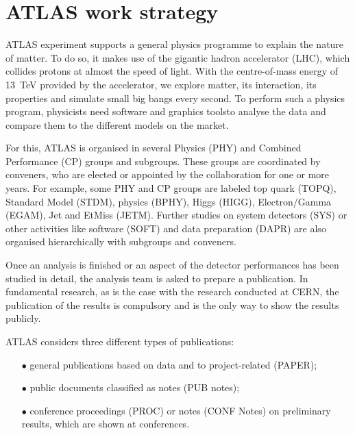 
\section{ATLAS work strategy}%
\label{sec:ATLAS_work_strategy}


ATLAS experiment supports a  general physics programme to explain the nature of matter. To do so,  it makes use of the gigantic hadron accelerator (LHC), which collides protons at almost the speed of light. With the centre-of-mass energy of \SI{13}{\TeV} provided by the accelerator, we explore matter, its interaction, its properties and simulate small big bangs every second. To perform such a physics program, physicists need software and graphics toolsto analyse the data and compare them to the different models on the market.

For this, ATLAS is organised in several Physics (PHY) and  Combined Performance (CP) groups and subgroups. These groups are coordinated by conveners, who are elected or appointed by the collaboration for one or more years.
For example, some  PHY and CP groups are labeled top quark (TOPQ), Standard Model (STDM), \PB physics (BPHY), Higgs (HIGG), Electron/Gamma (EGAM), Jet and EtMiss (JETM).
Further studies on system detectors (SYS) or other activities like software (SOFT) and data preparation (DAPR) are also organised hierarchically with subgroups and conveners.

Once an analysis is finished or an aspect of the detector performances has been studied in detail,
the analysis team is asked to prepare a publication.
In fundamental research, as is the case with the research conducted at CERN, the publication of the results is  compulsory and is the only way to show the results publicly.

ATLAS considers three different types of publications:
\begin{itemize}
    \item[\tiny$\bullet$] general publications based on data and to project-related  (PAPER);
    \item[\tiny$\bullet$] public documents classified as notes (PUB notes);
    \item[\tiny$\bullet$] conference proceedings (PROC) or notes (CONF Notes) on preliminary results, which are shown at conferences.
\end{itemize}

